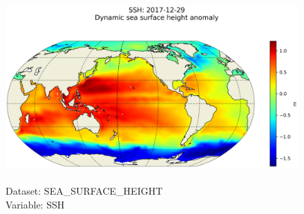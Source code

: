 \begin{figure}[H]
\centering
\includegraphics[scale=0.5]{../images/plots/latlon_plots/Sea_Surface_Height/SSH.png}
\caption{\\Dataset: SEA\_SURFACE\_HEIGHT\\Variable: SSH}
\label{tab:table-SEA_SURFACE_HEIGHT_SSH-Plot}
\end{figure}
\pagebreak
